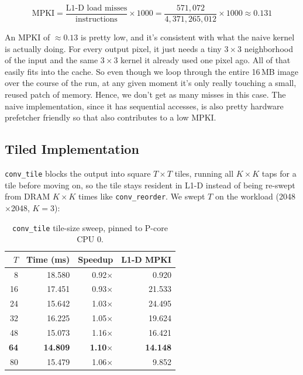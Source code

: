 \documentclass[11pt]{article}
\begin{document}
\[
    \text{MPKI} = \frac{\text{L1-D load misses}}{\text{instructions}} \times 1000
    = \frac{571{,}072}{4{,}371{,}265{,}012} \times 1000 \approx 0.131
\]

\begin{insightbox}
    An MPKI of $\approx 0.13$ is pretty low, and it's consistent with what the naive kernel is actually doing. For every
    output pixel, it just needs a tiny $3\times3$ neighborhood of the input
    and the same $3\times3$ kernel it already used one pixel ago. All of
    that easily fits into the cache. So even though we loop through the entire 16\,MB image over the course of the run, at
    any given moment it's only really touching a small, reused patch of
    memory. Hence, we don't get as many misses in this case. The naive implementation, since it has sequential accesses,
    is also pretty hardware prefetcher friendly so that also contributes to a low MPKI.
\end{insightbox}

\subsection{Tiled Implementation}

\texttt{conv\_tile} blocks the output into square $T \times T$ tiles, running
all $K \times K$ taps for a tile before moving on, so the tile stays resident
in L1-D instead of being re-swept from DRAM $K \times K$ times like
\texttt{conv\_reorder}. We swept $T$ on the workload
(2048$\times$2048, $K=3$):

\begin{table}[H]
    \centering
    \begin{tabular}{rrrr}
        \toprule
        \textbf{$T$} & \textbf{Time (ms)} & \textbf{Speedup} & \textbf{L1-D MPKI} \\
        \midrule
        8  & 18.580 & 0.92$\times$ & 0.920 \\
        16 & 17.451 & 0.93$\times$ & 21.533 \\
        24 & 15.642 & 1.03$\times$ & 24.495 \\
        32 & 16.225 & 1.05$\times$ & 19.624 \\
        48 & 15.073 & 1.16$\times$ & 16.421 \\
        \textbf{64} & \textbf{14.809} & \textbf{1.10$\times$} & \textbf{14.148} \\
        80 & 15.479 & 1.06$\times$ & 9.852 \\
        \bottomrule
    \end{tabular}
    \caption{\texttt{conv\_tile} tile-size sweep, pinned to P-core CPU 0.}
    \label{tab:tile-sweep}
\end{table}
\end{document}
